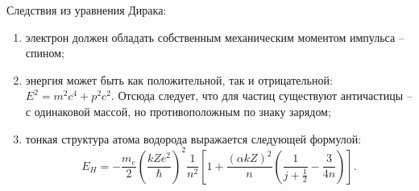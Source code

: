 Следствия из уравнения Дирака:
\begin{enumerate}
    \item электрон должен обладать собственным механическим моментом импульса --
    спином;
    
    \item энергия может быть как положительной, так и отрицательной: \( E^2 =
    m^2c^4 + p^2c^2 \). Отсюда следует, что для частиц существуют античастицы --
    с одинаковой массой, но противоположным по знаку зарядом;
    
    \item тонкая структура атома водорода выражается следующей формулой:
    \[
        E_H = -\frac{m_e}{2}\left(\frac{kZe^2}{\hbar}\right)^2 \frac{1}{n^2}
        \left[1 + \frac{(\alpha kZ)^2}{n}\left(\frac{1}{j + \frac{1}{2}} -
        \frac{3}{4n}\right)\right].
    \]
\end{enumerate}

\newpage
